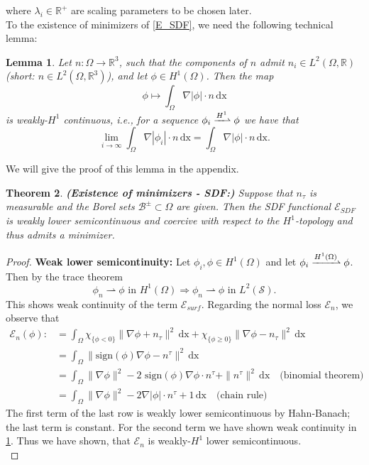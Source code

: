 \documentclass[draft,12pt,openany]{book}
\newcommand{\R}{\mathbb{R}}
\def\S{\mathcal{S}}
\theoremstyle{plainnormal}
\newtheorem{theorem}{Theorem}[section]
\newtheorem{lemma}[theorem]{Lemma}
\theoremstyle{remark}
\begin{document}
where $\lambda_i\in\R^+$ are scaling parameters to be chosen later.\\
To the existence of minimizers of \eqref{E_SDF}, we need the following technical lemma: 
\begin{lemma}\label{technicalLemma}
    Let $n: \Omega \rightarrow \R^3$, such that the components of $n$ admit  $n_i\in L^2(\Omega, \R)$ (short: $n\in L^2(\Omega, \R^3)$), and let $\phi\in H^1(\Omega)$. Then the map $$\phi \mapsto \int_\Omega \nabla |\phi|\cdot n \,\mathrm{dx}$$ is weakly-$H^1$ continuous, i.e., for a sequence $\phi_i \xrightharpoonup{H^1}\phi$ we have that $$\lim_{i\rightarrow\infty}\int_\Omega \nabla|\phi_i|\cdot n  \,\mathrm{dx} = \int_\Omega \nabla|\phi|\cdot n\,\mathrm{dx}.$$
\end{lemma}
We will give the proof of this lemma in the appendix.
\begin{theorem}\label{ProofExSDF}\textbf{(Existence of minimizers - SDF:)} 
Suppose that $n_\tau$ is measurable and the Borel sets $\mathcal{B}^{\pm}\subset \Omega$ are given. Then the SDF functional $\mathcal{E}_{SDF}$ is weakly lower semicontinuous and coercive with respect to the $H^1$-topology and thus admits a minimizer. 
\end{theorem}\begin{proof} \textbf{Weak lower semicontinuity:}
Let $\phi_i, \phi \in H^1(\Omega)$ and let $\phi_i \xrightharpoonup{H^1(\Omega)}\phi$. Then by the trace theorem $$\phi_n \rightharpoonup\phi \text{ in }H^1(\Omega) \Rightarrow \phi_n \rightharpoonup\phi \text{ in }L^2(\S).$$
This shows weak continuity of the term $\mathcal{E}_{surf}$. Regarding the normal loss $\mathcal{E}_n$, we observe that \begin{align*}
    \mathcal{E}_n(\phi) :&= \int_\Omega \chi_{\{\phi < 0\}} \|\nabla \phi + n_\tau\|^2 \,\mathrm{dx} + \chi_{\{\phi \geq 0\}} \|\nabla \phi - n_\tau\|^2 \,\mathrm{dx}\\&= \int_\Omega \|\text{sign}(\phi) \nabla \phi - n^\tau\|^ 2\,\mathrm{dx}\\
    & =\int_\Omega \|\nabla \phi\|^2  -2 \text{ sign} (\phi) \nabla \phi \cdot n^\tau  + \|n^\tau\|^2 \,\mathrm{dx} \quad \text{(binomial theorem)}\\
    &= \int_\Omega \|\nabla \phi\|^2  -2 \nabla |\phi| \cdot n^\tau  + 1 \,\mathrm{dx} \quad \text{(chain rule)}
\end{align*}
The first term of the last row is weakly lower semicontinuous by Hahn-Banach; the last term is constant. For the second term we have shown weak continuity in \cref{technicalLemma}. Thus we have shown, that $\mathcal{E}_n$ is weakly-$H^1$ lower semicontinuous.\\

\end{proof}
\end{document}
